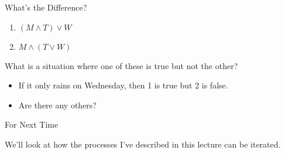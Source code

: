 \documentclass[
  ignorenonframetext,
]{beamer}
\providecommand{\tightlist}{%
  \setlength{\itemsep}{0pt}\setlength{\parskip}{0pt}}
\renewcommand{\,}{\text{, }}
\begin{document}
\begin{frame}{What's the Difference?}
\protect\hypertarget{whats-the-difference}{}

\begin{enumerate}
\tightlist
\item
  \((M \wedge T) \vee W\)
\item
  \(M \wedge (T \vee W)\)
\end{enumerate}

What is a situation where one of these is true but not the other?

\begin{itemize}[<+->]
\tightlist
\item
  If it only rains on Wednesday, then 1 is true but 2 is false.
\item
  Are there any others?
\end{itemize}

\end{frame}

\begin{frame}{For Next Time}
\protect\hypertarget{for-next-time}{}

We'll look at how the processes I've described in this lecture can be
iterated.

\end{frame}
\end{document}

